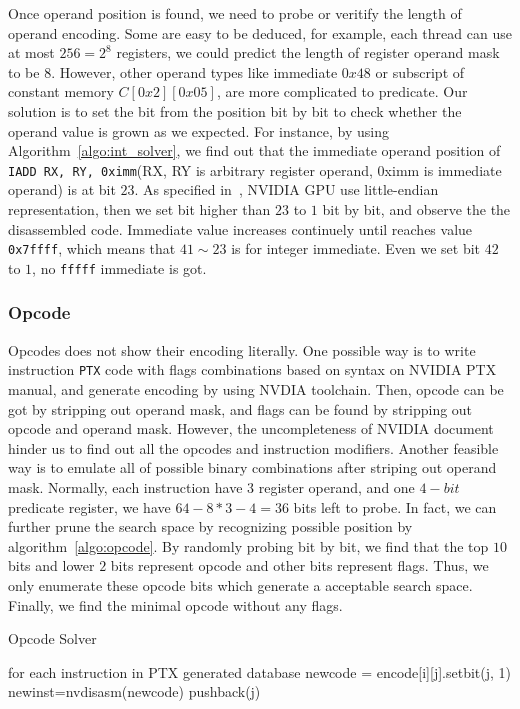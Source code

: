 Once operand position is found, we need to probe or veritify the length of operand encoding. Some are easy to be
deduced, for example, each thread can use at most $256=2^{8}$ registers, we could predict the length of register operand mask to be $8$.
However, other operand types like immediate $0x48$ or subscript of constant memory $C[0x2][0x05]$, are more complicated to predicate. Our solution is to set the bit from the position bit by bit to check whether the operand value is grown as we expected. For instance, by using Algorithm~\ref{algo:int_solver}, we find out that the immediate operand position of {\tt IADD RX, RY, 0ximm}(RX, RY is arbitrary register operand, 0ximm is immediate operand) is at bit $23$. As specified in~\cite{cuda2015programming}, NVIDIA GPU use little-endian representation, then we set bit higher than $23$ to $1$ bit by bit, and observe the the disassembled code. Immediate value increases continuely until reaches value {\tt 0x7ffff}, which means that $41\sim23$ is for integer immediate. Even we set bit $42$ to $1$, no {\tt fffff} immediate is got. 

\subsubsection{Opcode}
Opcodes does not show their encoding literally. One possible way is to write instruction {\tt PTX} code with flags
combinations based on syntax on NVIDIA PTX manual, and generate encoding by using NVDIA toolchain.
Then, opcode can be got by stripping out operand mask, and flags can be found by stripping out opcode and operand mask. However, the uncompleteness of NVIDIA document hinder us to find out all the opcodes and instruction modifiers. Another feasible way is to emulate all of possible binary combinations after striping out operand mask.
Normally, each instruction have $3$ register operand, and one $4-bit$ predicate register, we have $64-8*3-4=36$ bits left to probe.
In fact, we can further prune the search space by recognizing possible position by algorithm~\ref{algo:opcode}. By randomly probing bit by bit, we find that the top $10$ bits and lower $2$ bits represent opcode and other bits represent flags. Thus, we only enumerate these opcode bits which generate a acceptable search space. Finally, we find the minimal opcode without any flags. 


\begin{algorithm}
      \caption{Opcode Solver}\label{algo:opcode}
  \begin{algorithmic}[1]
      \State for each instruction in PTX generated database
      \State newcode = encode[i][j].setbit(j, 1)
      \State newinst=nvdisasm(newcode)
      \State pushback(j)
      \EndIf
      \EndIf
      \EndFor
      \EndFor
  \end{algorithmic}
\end{algorithm}

